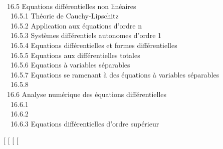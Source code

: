  \\ ~16.5
{Equations différentielles non
linéaires} \\ ~~16.5.1 {Théorie
de Cauchy-Lipschitz} \\ ~~16.5.2
{Application aux équations
d'ordre n} \\ ~~16.5.3 {Systèmes
différentiels autonomes d'ordre 1} \\ ~~16.5.4
{Equations différentielles et
formes différentielles} \\ ~~16.5.5
{Equations aux différentielles
totales} \\ ~~16.5.6 {Equations
à variables séparables} \\ ~~16.5.7
{Equations se ramenant à des
équations à variables séparables} \\ ~~16.5.8
 \\ ~16.6
{Analyse numérique des équations
différentielles} \\ ~~16.6.1
 \\ ~~16.6.2
 \\
~~16.6.3 {Equations
différentielles d'ordre supérieur}

{[}
{[}
{[}
{[}

